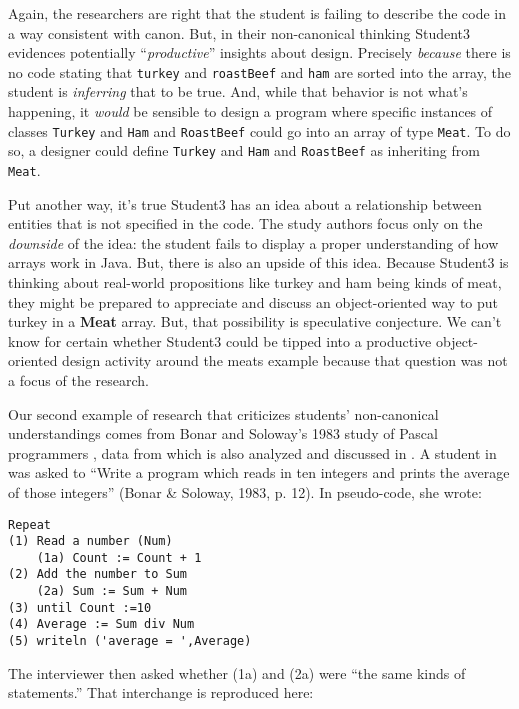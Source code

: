 Again, the researchers are right that the student is failing to describe
the code in a way consistent with canon. But, in their non-canonical thinking Student3 evidences
potentially ``\emph{productive}'' \cite{hammer_form_2002,hammer_tapping_2003} insights about design. Precisely \emph{because}
there is no code stating that \texttt{turkey} and \texttt{roastBeef} and
\texttt{ham} are sorted into the array, the student is \emph{inferring} that to
be true. And, while that behavior is not what's happening, it
\emph{would} be sensible to design a program where specific instances of
classes \texttt{Turkey} and \texttt{Ham} and \texttt{RoastBeef} could go
into an array of type \texttt{Meat}. To do so, a designer could define
\texttt{Turkey} and \texttt{Ham} and \texttt{RoastBeef} as inheriting
from \texttt{Meat}.

Put another way, it's true Student3 has an idea about a relationship between entities that
is not specified in the code. The study authors focus only on the \emph{downside} of the idea: the
student fails to display a proper understanding of how arrays work in
Java. But, there
is also an upside of this idea. Because Student3 is thinking about
real-world propositions like turkey and ham being kinds of meat, they
might be prepared to appreciate and discuss an object-oriented way to
put turkey in a \textbf{Meat} array. But, that possibility is
speculative conjecture. We can't know for certain whether Student3 could
be tipped into a productive object-oriented design activity around the
meats example because that question was not a focus of the research.

Our second example of research that criticizes students' non-canonical
understandings comes from Bonar and Soloway's 1983 study of Pascal
programmers \cite{bonar_uncovering_1983}, data from which is also analyzed and discussed in \cite{pea_languageindependent_1986}. A student in
\cite{bonar_uncovering_1983} was asked to ``Write a program which reads in
ten integers and prints the average of those integers'' (Bonar \&
Soloway, 1983, p. 12). In pseudo-code, she wrote:

\begin{verbatim}
Repeat
(1) Read a number (Num)
    (1a) Count := Count + 1
(2) Add the number to Sum
    (2a) Sum := Sum + Num
(3) until Count :=10
(4) Average := Sum div Num
(5) writeln ('average = ',Average)
\end{verbatim}

The interviewer then asked whether (1a) and (2a) were ``the same kinds
of statements.'' That interchange is reproduced here:

